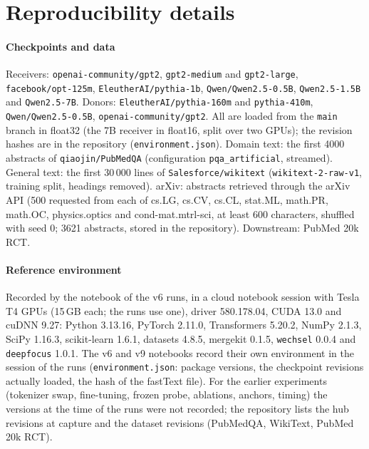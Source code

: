 \documentclass[preprint,12pt]{elsarticle}
\begin{document}
\section{Reproducibility details}
\label{app:repro}
\paragraph{Checkpoints and data}\sloppy Receivers: \texttt{openai-community/gpt2}, \texttt{gpt2-medium} and \texttt{gpt2-large}, \texttt{facebook/opt-125m}, \texttt{EleutherAI/pythia-1b}, \texttt{Qwen/Qwen2.5-0.5B}, \texttt{Qwen2.5-1.5B} and \texttt{Qwen2.5-7B}. Donors: \texttt{EleutherAI/pythia-160m} and \texttt{pythia-410m}, \texttt{Qwen/Qwen2.5-0.5B}, \texttt{openai-community/gpt2}. All are loaded from the \texttt{main} branch in float32 (the 7B receiver in float16, split over two GPUs); the revision hashes are in the repository (\texttt{environment.json}). Domain text: the first 4000 abstracts of \texttt{qiaojin/PubMedQA} (configuration \texttt{pqa\_artificial}, streamed). General text: the first 30\,000 lines of \texttt{Salesforce/wikitext} (\texttt{wikitext-2-raw-v1}, training split, headings removed). arXiv: abstracts retrieved through the arXiv API (500 requested from each of cs.LG, cs.CV, cs.CL, stat.ML, math.PR, math.OC, physics.optics and cond-mat.mtrl-sci, at least 600 characters, shuffled with seed 0; 3621 abstracts, stored in the repository). Downstream: PubMed 20k RCT.

\paragraph{Reference environment} Recorded by the notebook of the v6 runs, in a cloud notebook session with Tesla T4 GPUs (15\,GB each; the runs use one), driver 580.178.04, CUDA 13.0 and cuDNN 9.27: Python 3.13.16, PyTorch 2.11.0, Transformers 5.20.2, NumPy 2.1.3, SciPy 1.16.3, scikit-learn 1.6.1, datasets 4.8.5, mergekit 0.1.5, \texttt{wechsel} 0.0.4 and \texttt{deepfocus} 1.0.1. The v6 and v9 notebooks record their own environment in the session of the runs (\texttt{environment.json}: package versions, the checkpoint revisions actually loaded, the hash of the fastText file). For the earlier experiments (tokenizer swap, fine-tuning, frozen probe, ablations, anchors, timing) the versions at the time of the runs were not recorded; the repository lists the hub revisions at capture and the dataset revisions (PubMedQA, WikiText, PubMed 20k RCT).
\end{document}
